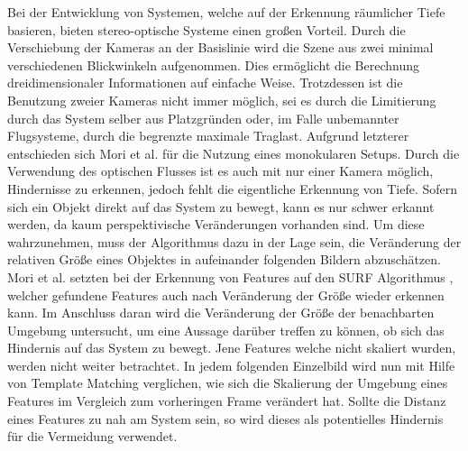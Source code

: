 \noindent
Bei der Entwicklung von Systemen, welche auf der Erkennung räumlicher Tiefe basieren, bieten stereo-optische Systeme einen großen Vorteil. Durch die Verschiebung der Kameras an der Basislinie wird die Szene aus zwei minimal verschiedenen Blickwinkeln aufgenommen. Dies ermöglicht die Berechnung dreidimensionaler Informationen auf einfache Weise. 
Trotzdessen ist die Benutzung zweier Kameras nicht immer möglich, sei es durch die Limitierung durch das System selber aus Platzgründen oder, im Falle unbemannter Flugsysteme, durch die begrenzte maximale Traglast. Aufgrund letzterer entschieden sich Mori et al. \cite{mori2013first} für die Nutzung eines monokularen Setups. Durch die Verwendung des optischen Flusses ist es auch mit nur einer Kamera möglich, Hindernisse zu erkennen, jedoch fehlt die eigentliche Erkennung von Tiefe. Sofern sich ein Objekt direkt auf das System zu bewegt, kann es nur schwer erkannt werden, da kaum perspektivische Veränderungen vorhanden sind. Um diese wahrzunehmen, muss der Algorithmus dazu in der Lage sein, die Veränderung der relativen Größe eines Objektes in aufeinander folgenden Bildern abzuschätzen. Mori et al. setzten bei der Erkennung von Features auf den SURF Algorithmus  \cite{bay2006surf} , welcher gefundene Features auch nach Veränderung der Größe wieder erkennen kann. Im Anschluss daran wird die Veränderung der Größe der benachbarten Umgebung untersucht, um eine Aussage darüber treffen zu können, ob sich das Hindernis auf das System zu bewegt. Jene Features welche nicht skaliert wurden, werden nicht weiter betrachtet. 
In jedem folgenden Einzelbild wird nun mit Hilfe von Template Matching verglichen, wie sich die Skalierung der Umgebung eines Features im Vergleich zum vorheringen Frame verändert hat. Sollte die Distanz eines Features zu nah am System sein, so wird dieses als potentielles Hindernis für die Vermeidung verwendet.
